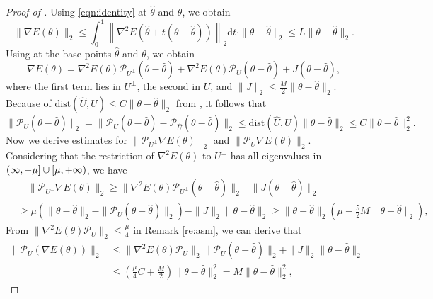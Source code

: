 \documentclass[final]{siamart251216}
\begin{document}
\begin{proof}[Proof of ]
Using \eqref{eqn:identity} at $\hat\theta$ and $\theta$, we obtain 
\begin{equation}
\|\nabla E(\theta)\|_2
\leqslant
\int_{0}^{1}\left\|\nabla^{2}E(\hat\theta+t(\theta-\hat\theta))\right\|_2\mathrm{d}t\cdot
\|\theta-\hat\theta \|_2\leqslant L\|\theta-\hat\theta\|_2.
\end{equation}
Using  at the base points $\hat\theta$ and $\theta$, we obtain 
\begin{equation}
\nabla E(\theta)=
\nabla^2 E(\theta)\mathcal{P}_{{U}^\perp}(\theta-\hat\theta)+
\nabla^2 E(\theta)\mathcal{P}_{{U}}(\theta-\hat\theta)+ 
J(\theta-\hat\theta),
\end{equation}  
where the first term lies in ${U}^\perp$, the second in $U$, and $\|J\|_2\leqslant \tfrac M2 \|\theta-\hat\theta\|_2$.
Because of $\mathrm{dist}(\widehat{U}, U) \leqslant C \|\theta-\hat{\theta}\|_2$ from , it follows that
\begin{equation*}
\|\mathcal{P}_{{U}}(\theta-\hat\theta)\|_2=
\|\mathcal{P}_{U}(\theta-\hat{\theta})-\mathcal{P}_{\widehat{U}}(\theta-\hat{\theta})\|_2
\leqslant 
\mathrm{dist}(\widehat{U},U) \|\theta-\hat{\theta}\|_2 
\leqslant C\|\theta-\hat{\theta}\|_2^2.
\end{equation*}
Now we derive estimates for 
$\|\mathcal{P}_{{U}^\perp}\nabla E(\theta)\|_2$
and $\|\mathcal{P}_{U}\nabla E(\theta)\|_2$.
Considering that the restriction of $\nabla^2E(\theta)$ to $U^\perp$ has all eigenvalues in $(\-\infty,-\mu]\cup [\mu,+\infty)$, we have
\begin{equation*}
\begin{aligned}
& \quad \|\mathcal{P}_{{U}^\perp}\nabla E(\theta)\|_2
\geqslant
\|\nabla^2 E(\theta)\mathcal{P}_{{U}^\perp}(\theta-\hat\theta)\|_2-\|J(\theta-\hat\theta)\|_2\\
&\geqslant
\mu\left(\|\theta-\hat\theta\|_2-\|\mathcal{P}_{{U}}(\theta-\hat\theta)\|_2\right)-\|J\|_2\|\theta-\hat\theta\|_2
\geqslant\|\theta-\hat\theta\|_2\left(\mu-\tfrac{5}{2}M\|\theta-\hat\theta\|_2\right),   
\end{aligned}
\end{equation*}
From $\|\nabla^2E(\theta)\mathcal{P}_{{U}}\|_2\leqslant\frac{\mu}{4}$  in Remark \ref{re:asm}, we can derive that
\begin{equation}
\begin{aligned}
\|\mathcal{P}_{U}(\nabla E(\theta))\|_2&\leqslant \|\nabla^2E(\theta)\mathcal{P}_{{U}}\|_2\|\mathcal{P}_{{U}}(\theta-\hat\theta)\|_2+\|J\|_2\|\theta-\hat\theta\|_2\\
&\leqslant\left(\frac{\mu}{4}C+\frac M2\right)\|\theta-\hat\theta\|_2^2=M\|\theta-\hat\theta\|_2^2,
\end{aligned}
\end{equation}  
\end{proof}
\end{document}
